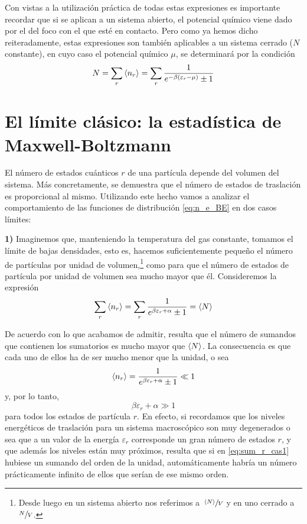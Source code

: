 Con vistas a la utilización práctica de todas estas expresiones es importante recordar que si se aplican a un sistema abierto, el potencial químico viene dado por el del foco con el que esté en contacto.
Pero como ya hemos dicho reiteradamente, estas expresiones son también aplicables a un sistema cerrado ($N$ constante), en cuyo caso el potencial químico $\mu$, se determinará por la condición
\begin{equation}
	N = \sum_r \expval{n_r} = \sum_r \frac{1}{e^{-\beta(\varepsilon_r - \mu)} \pm 1}
\end{equation}

\section{El límite clásico: la estadística de Maxwell-Boltzmann}

El número de estados cuánticos $r$ de una partícula depende del volumen del sistema.
Más concretamente, se demuestra que el número de estados de traslación es proporcional al mismo.
Utilizando este hecho vamos a analizar el comportamiento de las funciones de distribución \eqref{eq:n_e_BE} en dos casos límites:

\textbf{1)} Imaginemos que, manteniendo la temperatura del gas constante, tomamos el límite de bajas densidades, esto es, hacemos suficientemente pequeño el número de partículas por unidad de volumen,\footnote{Desde luego en un sistema abierto nos referimos a $\sfrac{\expval{N}}{V}$ y en uno cerrado a $\sfrac{N}{V}$.} como para que el número de estados de partícula por unidad de volumen sea mucho mayor que él. Consideremos la expresión
\begin{equation}\label{eq:sum_r_cas1}
	\sum_r \expval{n_r} = \sum_r \frac{1}{e^{\beta\varepsilon_r + \alpha} \pm 1} = \expval{N}
\end{equation}

De acuerdo con lo que acabamos de admitir, resulta que el número de sumandos que contienen los sumatorios es mucho mayor que $\expval{N}$. La consecuencia es que cada uno de ellos ha de ser mucho menor que la unidad, o sea
\begin{equation}\label{eq:sum_r_cas1_2}
	\expval{n_r} = \frac{1}{e^{\beta\varepsilon_r + \alpha} \pm 1} \ll 1
\end{equation}
y, por lo tanto,
\begin{equation}\label{eq:lim_exp}
	\beta\varepsilon_r + \alpha \gg 1
\end{equation}
para todos los estados de partícula $r$.
En efecto, si recordamos que los niveles energéticos de traslación para un sistema macroscópico son muy degenerados o sea que a un valor de la energía $\varepsilon_r$ corresponde un gran número de estados $r$, y que además los niveles están muy próximos, resulta que si en \eqref{eq:sum_r_cas1} hubiese un sumando del orden de la unidad, automáticamente habría un número prácticamente infinito de ellos que serían de ese mismo orden.


